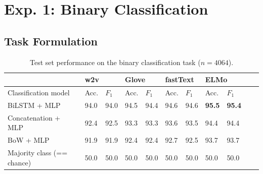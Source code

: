 \documentclass[letterpaper]{article} %
\begin{document}
\section{Exp. 1: Binary Classification}

\subsection{Task Formulation}
\label{ex1:data}

\begin{table}[h]
	\centering
	\begin{tabular}{@{}lllllllllll@{}}
		\toprule
		& \multicolumn{2}{l}{w2v} &\multicolumn{2}{l}{Glove}& \multicolumn{2}{l}{fastText} & \multicolumn{2}{l}{ELMo} \\ \midrule
		Classification model       & Acc. & $F_1$ & Acc. & $F_1$ & Acc. & $F_1$ & Acc. & $F_1$   \\ \midrule
		BiLSTM + MLP &   94.0  &  94.0 \hspace{0.8cm} &  94.5 & 94.4 \hspace{0.8cm} & 94.6 & 94.6 \hspace{0.8cm} & \textbf{95.5}& \textbf{95.4} \\
		Concatenation + MLP & 92.4 & 92.5 & 93.3& 93.3& 93.6 & 93.5 & 94.4 & 94.4\\
		BoW + MLP & 91.9& 91.9 & 92.4 &92.4 & 92.7& 92.5& 93.7 & 93.7\\
		Majority class (== chance)       & 50.0      & 50.0 &  50.0 & 50.0  & 50.0 &50.0 & 50.0 & 50.0\\
		\bottomrule
	\end{tabular}
	\caption{Test set performance on the binary classification task  ($n=4064$).}
	\label{ex1:accuracy}
\end{table}
\end{document}
